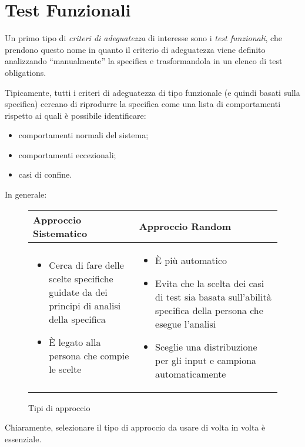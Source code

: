 \newpage
\section{Test Funzionali}

Un primo tipo di \textit{criteri di adeguatezza} di interesse sono i \textit{test funzionali}, che prendono questo nome in quanto il criterio di adeguatezza viene definito analizzando ``manualmente'' la specifica e trasformandola in un elenco di test obligations.

Tipicamente, tutti i criteri di adeguatezza di tipo funzionale (e quindi basati sulla specifica) cercano di riprodurre la specifica come una lista di comportamenti rispetto ai quali è possibile identificare: \begin{itemize}
    \item comportamenti normali del sistema;
    \item comportamenti eccezionali;
    \item casi di confine.
\end{itemize}

In generale:

\begin{figure}[H]
\caption{Tipi di approccio}
\begin{center}
\begin{tabular}{p{7cm} | p{7cm}}
    Approccio Sistematico & Approccio Random \\ \hline
    \begin{itemize}
        \item Cerca di fare delle scelte specifiche guidate da dei principi di analisi della specifica
        \item È legato alla persona che compie le scelte
    \end{itemize}
    & \begin{itemize}
        \item È più automatico
        \item Evita che la scelta dei casi di test sia basata sull'abilità specifica della persona che esegue l'analisi
        \item Sceglie una distribuzione per gli input e campiona automaticamente
    \end{itemize}
\end{tabular}
\end{center}
\end{figure}

Chiaramente, selezionare il tipo di approccio da usare di volta in volta è essenziale.


